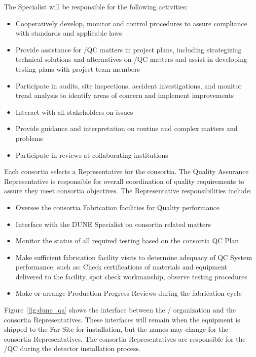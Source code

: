 The   Specialist will be responsible for the
following activities:
\begin{itemize}
	\item Cooperatively develop, monitor and control 
           procedures to assure compliance with 
          standards and applicable laws
     \item Provide assistance for /QC matters in project
       plans, including strategizing technical solutions and
       alternatives on /QC matters and assist in developing
       testing plans with project team members
	   \item Participate in audits, site inspections, accident
             investigations, and monitor trend analysis to identify
             areas of concern and implement improvements
	\item Interact with all stakeholders on  issues
      \item Provide guidance and interpretation on routine and complex
         matters and problems
	\item Participate in reviews at collaborating institutions
\end{itemize}

Each consortia selects a  Representative for the consortia.  The
Quality Assurance Representative is responsible for overall
coordination of quality requirements to assure they meet consortia
objectives.  The  Representative responsibilities include:
\begin{itemize}
  \item Oversee the consortia Fabrication facilities for Quality
    performance
  \item Interface with the DUNE  Specialist on consortia  related
    matters
  \item Monitor the status of all required testing based on the
    consortia QC Plan
  \item Make sufficient fabrication facility visits to determine
    adequacy of QC System performance, such as: Check certifications
    of materials and equipment delivered to the facility, spot check
    workmanship, observe testing procedures
  \item Make or arrange Production Progress Reviews during the
    fabrication cycle
\end{itemize}

Figure~\ref{fig:dune_qa} shows the interface between the
/  organization and the consortia 
Representatives.
These interfaces will remain when the equipment is shipped to the Far
Site for installation, but the names may change for the consortia 
Representatives.  The consortia  Representatives are responsible
for the /QC during the detector installation process.



